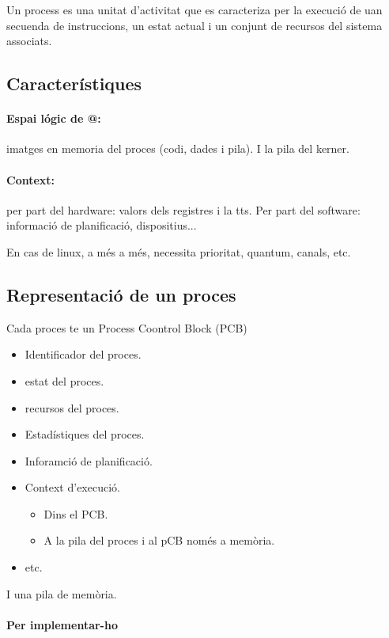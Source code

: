 \documentclass{article}
\begin{document}
    Un process es una unitat d'activitat que es caracteriza per la execució de uan secuenda de instruccions, un estat actual i un conjunt de recursos del sistema associats.

    \subsection{Característiques}

    \paragraph{Espai lógic de @: } imatges en memoria del proces (codi, dades i pila). I la pila del kerner.

    \paragraph{Context:} per part del hardware: valors dels registres i la tts. Per part del software: informació de planificació, dispositius...

    En cas de linux, a més a més, necessita prioritat, quantum, canals, etc.
            
    \subsection{Representació de un proces}

    Cada proces te un Process Coontrol Block (PCB)

    \begin{itemize}
        \item Identificador del proces.
        \item estat del proces.
        \item recursos del proces.
        \item Estadístiques del proces.
        \item Inforamció de planificació.
        \item Context d'execució.
            \begin{itemize}
                \item Dins el PCB.
                \item A la pila del proces i al pCB només a memòria.
            \end{itemize}
        \item etc.
    \end{itemize}

    I una pila de memòria.

    \paragraph{Per implementar-ho} 
\end{document}
